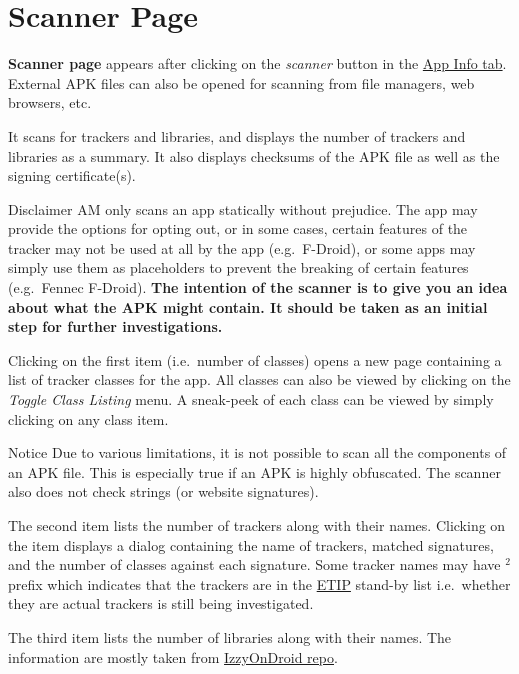 \section{Scanner Page}\label{sec:scanner-page} %
\textbf{Scanner page} appears after clicking on the \emph{scanner} button in the \hyperref[subsec:app-info-tab]{App Info
tab}. External APK files can also be opened for scanning from file managers, web browsers, etc.

It scans for trackers and libraries, and displays the number of trackers and libraries as a summary. It also displays
checksums of the APK file as well as the signing certificate(s).

\begin{danger}{Disclaimer}
    AM only scans an app statically without prejudice. The app may provide the options for opting out, or in some cases,
    certain features of the tracker may not be used at all by the app (e.g.\ F-Droid), or some apps may simply use them
    as placeholders to prevent the breaking of certain features (e.g.\ Fennec F-Droid). \textbf{The intention of the
    scanner is to give you an idea about what the APK might contain. It should be taken as an initial step for further
    investigations.}
\end{danger}

Clicking on the first item (i.e.\ number of classes) opens a new page containing a list of tracker classes for the app.
All classes can also be viewed by clicking on the \textit{Toggle Class Listing} menu. A sneak-peek of each class can be
viewed by simply clicking on any class item.

\begin{tip}{Notice}
    Due to various limitations, it is not possible to scan all the components of an APK file. This is especially true if
    an APK is highly obfuscated. The scanner also does not check strings (or website signatures).
\end{tip}

The second item lists the number of trackers along with their names. Clicking on the item displays a dialog containing
the name of trackers, matched signatures, and the number of classes against each signature. Some tracker names may have
$^2$ prefix which indicates that the trackers are in the \href{https://etip.exodus-privacy.eu.org}{ETIP} stand-by list
i.e.\ whether they are actual trackers is still being investigated.

The third item lists the number of libraries along with their names. The information are mostly taken from
\href{https://gitlab.com/IzzyOnDroid/repo}{IzzyOnDroid repo}.

